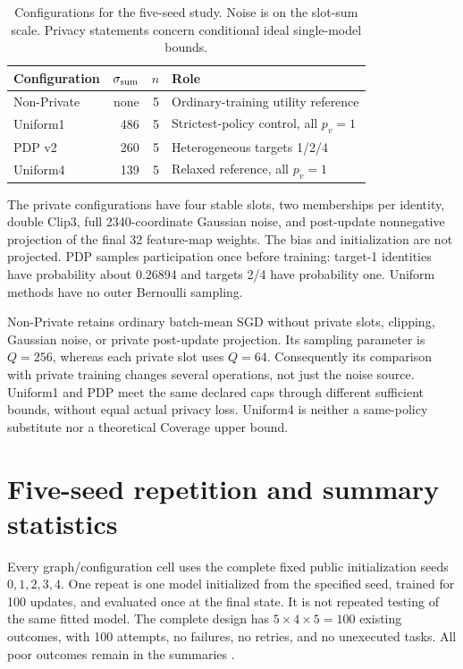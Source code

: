 \begin{table}[htbp]
\centering\small
\caption{Configurations for the five-seed study. Noise is on the slot-sum scale. Privacy statements concern conditional ideal single-model bounds.}\label{tab:config}
\begin{tabular}{lrrp{64mm}}\toprule
Configuration & $\sigma_{\rm sum}$ & $n$ & Role\\\midrule
Non-Private & none & 5 & Ordinary-training utility reference\\
Uniform1 & 486 & 5 & Strictest-policy control, all $p_v=1$\\
PDP v2 & 260 & 5 & Heterogeneous targets 1/2/4\\
Uniform4 & 139 & 5 & Relaxed reference, all $p_v=1$\\\bottomrule
\end{tabular}
\end{table}

The private configurations have four stable slots, two memberships per identity, double Clip3, full 2340-coordinate Gaussian noise, and post-update nonnegative projection of the final 32 feature-map weights. The bias and initialization are not projected. PDP samples participation once before training: target-1 identities have probability about 0.26894 and targets 2/4 have probability one. Uniform methods have no outer Bernoulli sampling.

Non-Private retains ordinary batch-mean SGD without private slots, clipping, Gaussian noise, or private post-update projection. Its sampling parameter is $Q=256$, whereas each private slot uses $Q=64$. Consequently its comparison with private training changes several operations, not just the noise source. Uniform1 and PDP meet the same declared caps through different sufficient bounds, without equal actual privacy loss. Uniform4 is neither a same-policy substitute nor a theoretical Coverage upper bound.

\section{Five-seed repetition and summary statistics}
Every graph/configuration cell uses the complete fixed public initialization seeds $0,1,2,3,4$. One repeat is one model initialized from the specified seed, trained for 100 updates, and evaluated once at the final state. It is not repeated testing of the same fitted model. The complete design has $5\times4\times5=100$ existing outcomes, with 100 attempts, no failures, no retries, and no unexecuted tasks. All poor outcomes remain in the summaries \cite{projectdev}.

